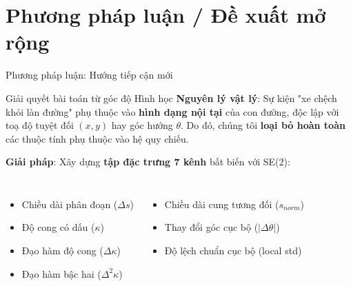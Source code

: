\documentclass[aspectratio=169,10pt]{beamer}
\begin{document}
\section{Phương pháp luận / Đề xuất mở rộng}

\begin{frame}{Phương pháp luận: Hướng tiếp cận mới}
\begin{block}{Giải quyết bài toán từ góc độ Hình học}
\small
\textbf{Nguyên lý vật lý}: Sự kiện "xe chệch khỏi làn đường" phụ thuộc vào \textbf{hình dạng nội tại} của con đường, độc lập với toạ độ tuyệt đối $(x,y)$ hay góc hướng $\theta$. Do đó, chúng tôi \textbf{loại bỏ hoàn toàn} các thuộc tính phụ thuộc vào hệ quy chiếu.

\textbf{Giải pháp}: Xây dựng \textbf{tập đặc trưng 7 kênh} bất biến với SE(2):
\vspace{-0.3em}
\begin{columns}[T]
\begin{itemize}
    \item Chiều dài phân đoạn ($\Delta s$)
    \item Độ cong có dấu ($\kappa$)
    \item Đạo hàm độ cong ($\Delta \kappa$)
    \item Đạo hàm bậc hai ($\Delta^2 \kappa$)
\end{itemize}
\begin{itemize}
    \item Chiều dài cung tương đối ($s_{norm}$)
    \item Thay đổi góc cục bộ ($|\Delta \theta|$)
    \item Độ lệch chuẩn cục bộ (local std)
\end{itemize}
\end{columns}
\end{block}
\end{frame}
\end{document}
